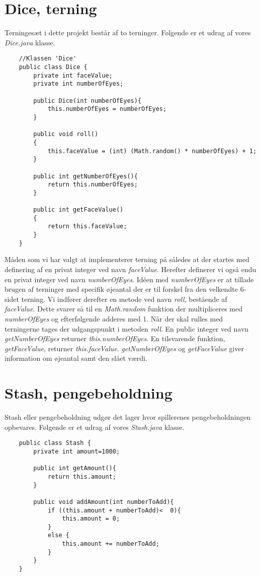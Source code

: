 \section{Dice, terning}
\noindent Terningesæt i dette projekt består af to terninger. 
Følgende er et udrag af vores \textit{Dice.java} klasse.\\
\begin{lstlisting}
    //Klassen 'Dice'    
    public class Dice {
        private int faceValue;
        private int numberOfEyes;

        public Dice(int numberOfEyes){
            this.numberOfEyes = numberOfEyes;
        }

        public void roll()
        {
            this.faceValue = (int) (Math.random() * numberOfEyes) + 1;
        }

        public int getNumberOfEyes(){
            return this.numberOfEyes;
        }

        public int getFaceValue()
        {
            return this.faceValue;
        }
    }
\end{lstlisting}
\vspace{2ex}

\noindent Måden som vi har valgt at implementerer terning på således at der startes med definering af en privat integer ved navn \textit{faceValue}.
Herefter definerer vi også endu en privat integer ved navn \textit{numberOfEyes}.
Idéen med \textit{numberOfEyes} er at tillade brugen af terninger med specifik øjeantal der er til forskel fra den velkendte 6-sidet terning.
Vi indfører derefter en metode ved navn \textit{roll}, bestående af \textit{faceValue}.
Dette svarer så til en \textit{Math.random} funktion der multipliceres med \textit{numberOfEyes} og efterfølgende adderes med 1.
Når der skal rulles med terningerne tages der udgangspunkt i metoden \textit{roll}.
En public integer ved navn \textit{getNumberOfEyes} returner \textit{this.numberOfEyes}.
En tilsvarende funktion, \textit{getFaceValue}, returner \textit{this.faceValue}.
\textit{getNumberOfEyes} og \textit{getFaceValue} giver information om øjeantal samt den slået værdi.\\

\section{Stash, pengebeholdning}
\noindent Stash eller pengebeholdning udgør det lager hvor spillerenes pengebeholdningen opbevares. 
Følgende er et udrag af vores \textit{Stash.java} klasse.\\
\begin{lstlisting}
    public class Stash {
        private int amount=1000;
    
        public int getAmount(){
            return this.amount;
        }
    
        public void addAmount(int numberToAdd){
            if ((this.amount + numberToAdd)<  0){
                this.amount = 0;
            }
            else {
                this.amount += numberToAdd;
            }
        }
    }    
\end{lstlisting}
\vspace{2ex}

